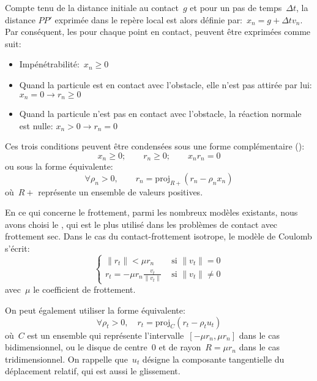 Compte tenu de la distance initiale au contact~$g$ et pour un pas de temps~$\Delta t$, la distance $PP'$ exprimée dans le repère local est alors définie par:~$x_n = g + \Delta t v_n$. Par conséquent, les  pour chaque point en contact, peuvent être exprimées comme suit:
\begin{itemize}
  \item Impénétrabilité:~$x_n \ge 0$
  \item Quand la particule est en contact avec l'obstacle, elle n'est pas attirée par lui:
	$x_n = 0 \rightarrow r_n \ge 0$
  \item Quand la particule n'est pas en contact avec l'obstacle, la réaction normale est nulle:
	$x_n > 0 \rightarrow r_n = 0$
\end{itemize}
Ces trois conditions peuvent être condensées sous une forme complémentaire ():
\begin{equation} x_n \ge 0; \qquad r_n \ge 0; \qquad x_n r_n = 0 \end{equation}
ou sous la forme équivalente:
\begin{equation} \forall \rho_n > 0, \qquad r_n = \mathrm{proj}_{R+} (r_n - \rho_n x_n) \end{equation}
où~$R+$ représente un ensemble de valeurs positives.

\medskip
En ce qui concerne le frottement, parmi les nombreux modèles existants, nous avons choisi le , qui est le plus utilisé dans les problèmes de contact avec frottement sec. Dans le cas du contact-frottement isotrope, le modèle de Coulomb s'écrit:
\begin{equation} \left\{\begin{array}{ll}
\|r_t\| < \mu r_n & \text{ si } \|v_t\|=0\\
r_t=-\mu r_n \frac{v_t}{\|v_t\|} & \text{ si } \|v_t\|\ne0
\end{array}\right. \end{equation}
avec~$\mu$ le coefficient de frottement.

On peut également utiliser la forme équivalente:
\begin{equation} \forall \rho_t>0, \quad r_t= \mathrm{proj}_C (r_t-\rho_t u_t) \end{equation}
où~$C$ est un ensemble qui représente l'intervalle~$[-\mu r_n, \mu r_n]$ dans le cas bidimensionnel, ou le disque de centre~$0$ et de rayon~$R= \mu r_n$ dans le cas tridimensionnel. On rappelle que~$u_t$ désigne la composante tangentielle du déplacement relatif, qui est aussi le glissement.


